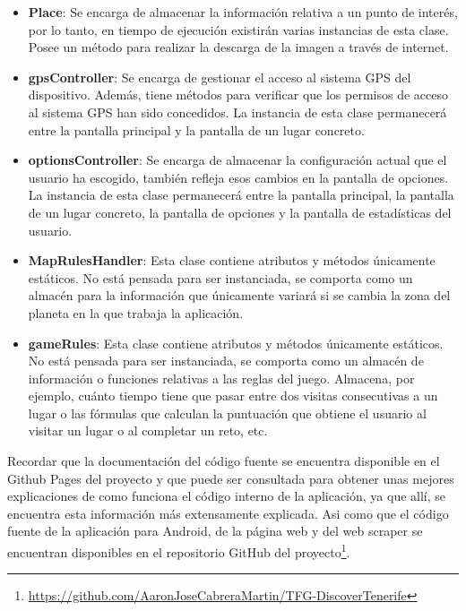 \begin{itemize}
\item \textbf{Place}: Se encarga de almacenar la información relativa a un punto de interés, por lo tanto, en tiempo de ejecución existirán varias instancias de esta clase. Posee un método para realizar la descarga de la imagen a través de internet.

\item \textbf{gpsController}: Se encarga de gestionar el acceso al sistema GPS del dispositivo. Además, tiene métodos para verificar que los permisos de acceso al sistema GPS han sido concedidos. La instancia de esta clase permanecerá entre la pantalla principal y la pantalla de un lugar concreto.

\item \textbf{optionsController}: Se encarga de almacenar la configuración actual que el usuario ha escogido, también refleja esos cambios en la pantalla de opciones. La instancia de esta clase permanecerá entre la pantalla principal, la pantalla de un lugar concreto, la pantalla de opciones y la pantalla de estadísticas del usuario.

\item \textbf{MapRulesHandler}: Esta clase contiene atributos y métodos únicamente estáticos. No está pensada para ser instanciada, se comporta como un almacén para la información que únicamente variará si se cambia la zona del planeta en la que trabaja la aplicación.

\item \textbf{gameRules}: Esta clase contiene atributos y métodos únicamente estáticos. No está pensada para ser instanciada, se comporta como un almacén de información o funciones relativas a las reglas del juego. Almacena, por ejemplo, cuánto tiempo tiene que pasar entre dos visitas consecutivas a un lugar o las fórmulas que calculan la puntuación que obtiene el usuario al visitar un lugar o al completar un reto, etc.
\end{itemize}

Recordar que la documentación del código fuente se encuentra disponible en el Github Pages del proyecto\cite{doxygenDiscoverTenerife} y que puede ser consultada para obtener unas mejores explicaciones de como funciona el código interno de la aplicación, ya que allí, se encuentra esta información más extensamente explicada. Asi como que el código fuente de la aplicación para Android, de la página web y del web scraper se encuentran disponibles en el repositorio GitHub del proyecto\footnote{\href{https://github.com/AaronJoseCabreraMartin/TFG-DiscoverTenerife}{https://github.com/AaronJoseCabreraMartin/TFG-DiscoverTenerife}}.


